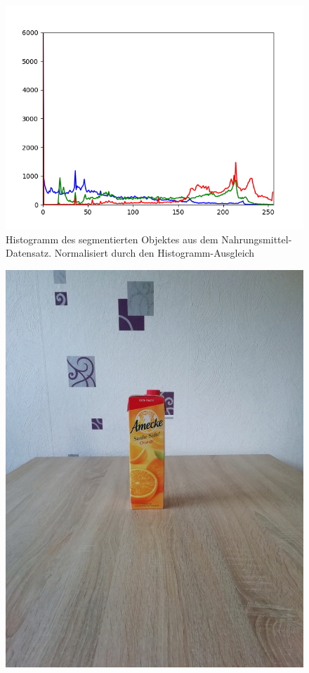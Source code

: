 \begin{appendices}
\begin{figure}[htb]
\begin{minipage}[c]{0.08\textwidth}
\end{minipage}
\hfill
\begin{minipage}[c]{0.3\textwidth}
\includegraphics[width=\textwidth]{Sources/Bild3_HA_histo.png}
\end{minipage}
\caption{Histogramm des segmentierten Objektes aus dem Nahrungsmittel-Datensatz. Normalisiert durch den Histogramm-Ausgleich}
\label{img:evalHA}
\end{figure}
\newpage
\begin{figure}[htb]
\begin{minipage}[c]{0.2\textwidth}
\includegraphics[width=\textwidth]{Sources/Bild1_GW.jpg}

\end{minipage}
\end{figure}
\end{appendices}
